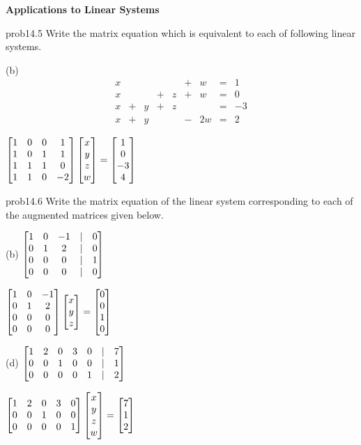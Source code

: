 \centerline{\bf  {Applications to Linear Systems}}

\begin{sol}{prob14.5} Write the matrix equation which is equivalent to each of  following linear systems.
\medskip

(b) $$\begin{matrix} x&&&&&+&w&=&1\\
x&&&+&z&+&w&=&0\\
x&+&y&+&z&&&=&-3\\
x&+&y&&&-&2w&=&2 \end{matrix} $$

\soln $\bmatrix 
1 & 0 & 0 & 1 \\
 1 & 0 & 1 & 1 \\
 1 & 1 & 1 & 0 \\
 1 & 1 & 0 & -2 \endbmatrix  \bmatrix x\\y\\ z\\w\endbmatrix = \bmatrix 1\\0\\ -3\\4\endbmatrix  $
\medskip

 

\end{sol}

\begin{sol}{prob14.6}  Write the matrix equation  of the linear system corresponding to each of the augmented matrices given below.
\medskip

(b) $ \bmatrix 1 & 0 & -1 &|&0 \\
 0 & 1 & 2 &|&0\\
 0 & 0 & 0&|&1 \\
 0 & 0 & 0 &|&0\endbmatrix$

\soln $ \bmatrix 
1 & 0 & -1\\
0 & 1 & 2\\
0 & 0 & 0\\
0 & 0 & 0 \endbmatrix \bmatrix x\\y\\ z\endbmatrix=
\bmatrix 0\\0\\ 1\\0\endbmatrix$
\medskip
%

(d) $\bmatrix  
1 & 2 & 0 & 3 & 0 &|& 7 \\
0 & 0 & 1 & 0 & 0 &|& 1 \\
0 & 0 & 0 & 0 & 1 &|& 2 \endbmatrix$

\soln  $\bmatrix  
1 & 2 & 0 & 3 & 0   \\
0 & 0 & 1 & 0 & 0  \\
0 & 0 & 0 & 0 & 1  \endbmatrix
\bmatrix x\\y\\ z\\w\endbmatrix =\bmatrix 7\\1\\ 2\endbmatrix $

\medskip

\end{sol}



